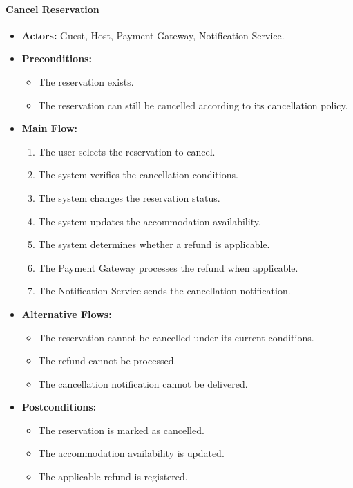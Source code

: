 \paragraph{Cancel Reservation}

\begin{itemize}
    \item \textbf{Actors:} Guest, Host, Payment Gateway, Notification Service.
    
    \item \textbf{Preconditions:}
    \begin{itemize}
        \item The reservation exists.
        \item The reservation can still be cancelled according to its cancellation policy.
    \end{itemize}
    
    \item \textbf{Main Flow:}
    \begin{enumerate}
        \item The user selects the reservation to cancel.
        \item The system verifies the cancellation conditions.
        \item The system changes the reservation status.
        \item The system updates the accommodation availability.
        \item The system determines whether a refund is applicable.
        \item The Payment Gateway processes the refund when applicable.
        \item The Notification Service sends the cancellation notification.
    \end{enumerate}
    
    \item \textbf{Alternative Flows:}
    \begin{itemize}
        \item The reservation cannot be cancelled under its current conditions.
        \item The refund cannot be processed.
        \item The cancellation notification cannot be delivered.
    \end{itemize}
    
    \item \textbf{Postconditions:}
    \begin{itemize}
        \item The reservation is marked as cancelled.
        \item The accommodation availability is updated.
        \item The applicable refund is registered.
    \end{itemize}
\end{itemize}


